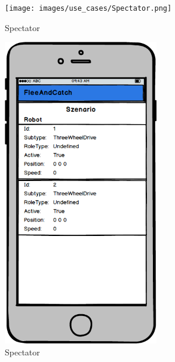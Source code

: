 \begin{figure}[h]
	\begin{center}
		\texttt{[image: images/use\_cases/Spectator.png]}
	\end{center}
	\caption{Spectator}
	\label{fig:UC_Spectator}
\end{figure}
\begin{figure}[h]
	\begin{center}
		\includegraphics[width=0.6\textwidth]{images/mockups/Spectator.png}
	\end{center}
	\caption{Spectator}
	\label{fig:Spectator}
\end{figure}

